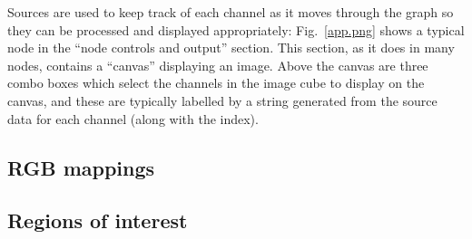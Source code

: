 Sources are used to keep track of each channel as it moves through the graph so they can be processed and displayed appropriately:
Fig.~\ref{app.png} shows a typical node in the ``node controls and output'' section. This section, as it does in many nodes,
contains a ``canvas'' displaying an image. Above the canvas are three combo boxes which select the channels in the image cube to display on the canvas,
and these are typically labelled by a string generated from the source data for each channel (along with the index).

\subsection{RGB mappings}


\subsection{Regions of interest}
